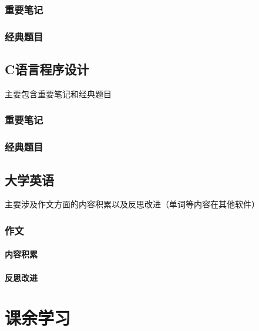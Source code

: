 \documentclass{book}
\begin{document}
\subsection{重要笔记}
\subsection{经典题目}
\section{C语言程序设计}
主要包含重要笔记和经典题目
\subsection{重要笔记}
\subsection{经典题目}
\section{大学英语}
主要涉及作文方面的内容积累以及反思改进（单词等内容在其他软件）
\subsection{作文}
\subsubsection{内容积累}
\subsubsection{反思改进}
\chapter{课余学习}
\end{document}
